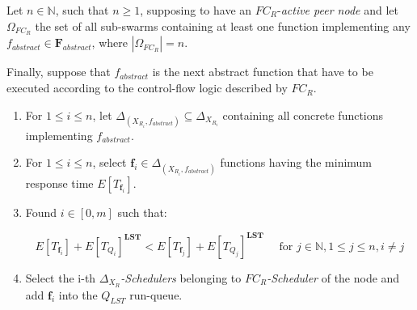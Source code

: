 \documentclass[10pt,a4paper]{article}
\theoremstyle{definition}
\begin{document}
Let $n \in \mathbb{N}$, such that $n \geq 1$, supposing to have an $FC_R$-\textit{active peer node} and let $\Omega_{FC_R}$ the set of all sub-swarms containing at least one function implementing any $f_{abstract} \in \textbf{F}_{abstract}$, where $|\Omega_{FC_R}| = n$.

Finally, suppose that $f_{abstract}$ is the next abstract function that have to be executed according to the control-flow logic described by $FC_R$.

\begin{enumerate}
\item For $1 \leq i \leq n$, let $\Delta_{(X_{R_i}, f_{abstract})} \subseteq \Delta_{X_{R_i}}$ containing all concrete functions implementing $f_{abstract}$.

\item For $1 \leq i \leq n$, select $\textbf{f}_i \in \Delta_{(X_{R_i}, f_{abstract})}$ functions having the minimum response time $E[T_{\textbf{f}_i}]$.

\item Found $i \in [0,m]$ such that: 

\begin{equation}
E[T_{\textbf{f}_i}] + E[T_{Q_i}]^{\textbf{LST}} < E[T_{\textbf{f}_j}] +E[T_{Q_j}]^{\textbf{LST}} \quad \text{ for } j \in \mathbb{N}, 1 \leq j \leq n, i \neq j
\end{equation}

\item Select the i-th \textit{$\Delta_{X_{R}}$-Schedulers} belonging to \textit{$FC_R$-Scheduler} of the node and add  $\textbf{f}_i$ into the $Q_{LST}$ run-queue.

\end{enumerate}
\end{document}
